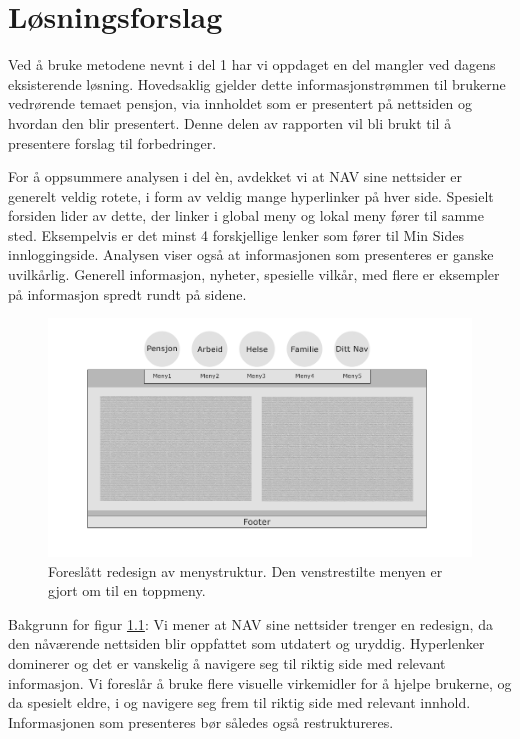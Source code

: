 \documentclass[informationsecurity]{gucmasterproject}
\begin{document}
\chapter{Løsningsforslag}
Ved å bruke metodene nevnt i del 1 har vi oppdaget en del mangler ved dagens eksisterende løsning. Hovedsaklig gjelder dette informasjonstrømmen til brukerne vedrørende temaet pensjon, via innholdet som er presentert på nettsiden og hvordan den blir presentert. Denne delen av rapporten vil bli brukt til å presentere forslag til forbedringer.

For å oppsummere analysen i del èn, avdekket vi at NAV sine nettsider er generelt veldig rotete, i form av veldig mange hyperlinker på hver side. Spesielt forsiden lider av dette, der linker i global meny og lokal meny fører til samme sted. Eksempelvis er det minst 4 forskjellige lenker som fører til Min Sides innloggingside. Analysen viser også at informasjonen som presenteres er ganske uvilkårlig. Generell informasjon, nyheter, spesielle vilkår, med flere er eksempler på informasjon spredt rundt på sidene.




\begin{figure}[h!]
	\centering
	\includegraphics[width=40em]{Skisse_1}
	\caption{Foreslått redesign av menystruktur. Den venstrestilte menyen er gjort om til en toppmeny.}
	\label{fig:skisse1}
\end{figure}




Bakgrunn for figur \ref{fig:skisse1}:
Vi mener at NAV sine nettsider trenger en redesign, da den nåværende nettsiden blir oppfattet som utdatert og uryddig. Hyperlenker dominerer og det er vanskelig å navigere seg til riktig side med relevant informasjon.  Vi foreslår å bruke flere visuelle virkemidler for å hjelpe brukerne, og da spesielt eldre, i og navigere seg frem til riktig side med relevant innhold. Informasjonen som presenteres bør således også restruktureres.
\end{document}
